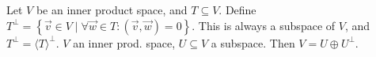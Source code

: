  Let $V$ be an inner product space, and $T \subseteq V$.
Define $T^\perp = \left\{ \vec{v} \in V \mid \forall \vec{w} \in T: (\vec{v}, \vec{w}) = 0 \right\}$.
This is always a subspace of $V$, and $T^\perp = \langle T \rangle^\perp$.
 $V$ an inner prod. space, $U \subseteq V$ a subspace.
Then $V = U \oplus U^\perp$.